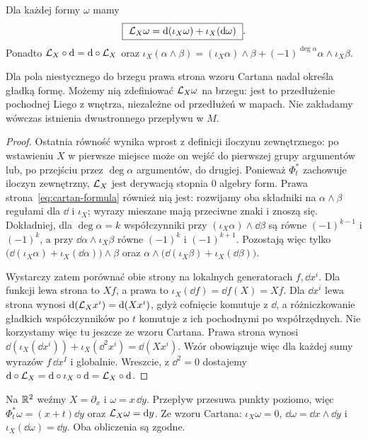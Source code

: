 \begin{twierdzenie}
\label{thm:cartan-formy}
Dla każdej formy $\omega$ mamy
\begin{equation}\label{eq:cartan-formula}
 \boxed{\ \mathcal L_X\omega=\mathrm d(\iota_X\omega)
       +\iota_X(\mathrm d\omega)\ }.
\end{equation}
Ponadto $\mathcal L_X\circ\mathrm d=\mathrm d\circ\mathcal L_X$ oraz
$\iota_X(\alpha\wedge\beta)=
(\iota_X\alpha)\wedge\beta
+(-1)^{\deg\alpha}\alpha\wedge\iota_X\beta$.
\end{twierdzenie}
Dla pola niestycznego do brzegu prawa strona wzoru Cartana
nadal określa gładką formę. Możemy nią zdefiniować
$\mathcal L_X\omega$ na brzegu: jest to przedłużenie pochodnej
Liego z wnętrza, niezależne od przedłużeń w mapach.
Nie zakładamy wówczas istnienia dwustronnego przepływu w $M$.
\begin{proof}
Ostatnia równość wynika wprost z definicji iloczynu
zewnętrznego: po wstawieniu $X$ w pierwsze miejsce
może on wejść do pierwszej grupy argumentów lub,
po przejściu przez $\deg\alpha$ argumentów, do drugiej.
Ponieważ $\Phi_t^*$ zachowuje iloczyn zewnętrzny,
$\mathcal L_X$ jest derywacją stopnia $0$ algebry form.
Prawa strona~\eqref{eq:cartan-formula} również nią jest:
rozwijamy oba składniki na $\alpha\wedge\beta$
regułami dla $\dd$ i $\iota_X$; wyrazy mieszane mają
przeciwne znaki i znoszą się. Dokładniej, dla $\deg\alpha=k$
współczynniki przy $(\iota_X\alpha)\wedge\dd\beta$ są równe
$(-1)^{k-1}$ i $(-1)^k$, a przy
$\dd\alpha\wedge\iota_X\beta$ równe $(-1)^k$ i $(-1)^{k+1}$.
Pozostają więc tylko
$\bigl(\dd(\iota_X\alpha)+\iota_X(\dd\alpha)\bigr)\wedge\beta$
oraz $\alpha\wedge\bigl(\dd(\iota_X\beta)+\iota_X(\dd\beta)\bigr)$.

Wystarczy zatem porównać obie strony na lokalnych
generatorach $f,\dd x^i$. Dla funkcji lewa strona to
$Xf$, a prawa to $\iota_X(\dd f)=\dd f(X)=Xf$.
Dla $\dd x^i$ lewa strona wynosi
$\mathrm d(\mathcal L_Xx^i)=\mathrm d(Xx^i)$, gdyż cofnięcie
komutuje z $\dd$, a różniczkowanie gładkich współczynników
po $t$ komutuje z ich pochodnymi po współrzędnych.
Nie korzystamy więc tu jeszcze ze wzoru Cartana.
Prawa strona wynosi
$\dd(\iota_X(\dd x^i))+\iota_X(\dd^2x^i)
=\dd(Xx^i)$. Wzór obowiązuje więc dla
każdej sumy wyrazów $f\,\dd x^I$ i globalnie.
Wreszcie, z $\dd^2=0$ dostajemy
$\mathrm d\circ\mathcal L_X=\mathrm d\circ\iota_X\circ\mathrm d
=\mathcal L_X\circ\mathrm d$.
\end{proof}

\begin{przyklad}
Na $\mathbb{R}^2$ weźmy $X=\partial_x$ i $\omega=x\,\dd y$.
Przepływ przesuwa punkty poziomo, więc
$\Phi_t^*\omega=(x+t)\dd y$ oraz
$\mathcal L_X\omega=\mathrm d y$. Ze wzoru Cartana:
$\iota_X\omega=0$, $\dd\omega=\dd x\wedge\dd y$
i $\iota_X(\dd\omega)=\dd y$. Oba obliczenia są zgodne.
\end{przyklad}
